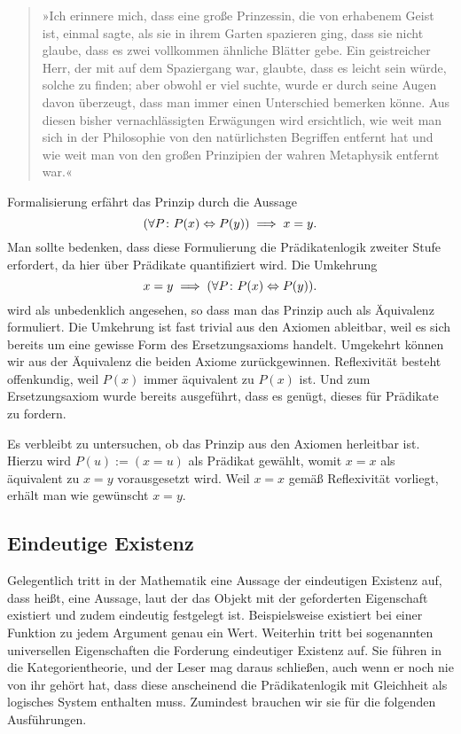 \begin{quote}
»Ich erinnere mich, dass eine große Prinzessin, die von erhabenem Geist
ist, einmal sagte, als sie in ihrem Garten spazieren ging, dass sie
nicht glaube, dass es zwei vollkommen ähnliche Blätter gebe. Ein
geistreicher Herr, der mit auf dem Spaziergang war, glaubte, dass es
leicht sein würde, solche zu finden; aber obwohl er viel suchte, wurde
er durch seine Augen davon überzeugt, dass man immer einen Unterschied
bemerken könne. Aus diesen bisher vernachlässigten Erwägungen wird
ersichtlich, wie weit man sich in der Philosophie von den natürlichsten
Begriffen entfernt hat und wie weit man von den großen Prinzipien der
wahren Metaphysik entfernt war.«
\end{quote}

\noindent
Formalisierung erfährt das Prinzip durch die Aussage
\[(\forall P\colon P(x)\Leftrightarrow P(y))\implies x=y.\]
Man sollte bedenken, dass diese Formulierung die Prädikatenlogik
zweiter Stufe erfordert, da hier über Prädikate quantifiziert wird.
Die Umkehrung
\[x=y\implies (\forall P\colon P(x)\Leftrightarrow P(y)).\]
wird als unbedenklich angesehen, so dass man das Prinzip auch als
Äquivalenz formuliert. Die Umkehrung ist fast trivial aus den
Axiomen ableitbar, weil es sich bereits um eine gewisse Form des
Ersetzungsaxioms handelt. Umgekehrt können wir aus der Äquivalenz die
beiden Axiome zurückgewinnen. Reflexivität besteht offenkundig, weil
$P(x)$ immer äquivalent zu $P(x)$ ist. Und zum Ersetzungsaxiom wurde
bereits ausgeführt, dass es genügt, dieses für Prädikate zu fordern.

Es verbleibt zu untersuchen, ob das Prinzip aus den Axiomen
herleitbar ist. Hierzu wird $P(u):=(x=u)$ als Prädikat gewählt, womit
$x=x$ als äquivalent zu $x=y$ vorausgesetzt wird. Weil $x=x$ gemäß
Reflexivität vorliegt, erhält man wie gewünscht $x=y$.

\subsection{Eindeutige Existenz}

Gelegentlich tritt in der Mathematik eine Aussage der eindeutigen
Existenz auf, dass heißt, eine Aussage, laut der das Objekt mit der
geforderten Eigenschaft existiert und zudem eindeutig festgelegt ist.
Beispielsweise existiert bei einer Funktion zu jedem Argument genau ein
Wert. Weiterhin tritt bei sogenannten universellen Eigenschaften die
Forderung eindeutiger Existenz auf. Sie führen in die Kategorientheorie,
und der Leser mag daraus schließen, auch wenn er noch nie von ihr gehört
hat, dass diese anscheinend die Prädikatenlogik mit Gleichheit als
logisches System enthalten muss. Zumindest brauchen wir sie für die
folgenden Ausführungen.

